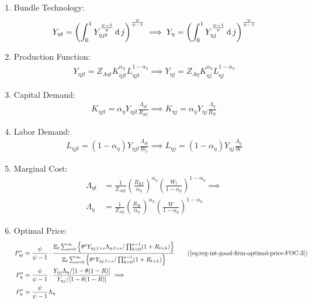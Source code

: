 \documentclass[
thesis.tex
]{subfiles}
\begin{document}
\begin{enumerate}
	\item Bundle Technology:
	\begin{align}
		Y_{\eta t} = \left( \int_{0}^{1} Y_{\eta jt}^{\frac{\psi-1}{\psi}} \dif j \right)^{\frac{\psi}{\psi-1}} \implies %
		Y_{\eta} = \left( \int_{0}^{1} Y_{\eta j}^{\frac{\psi-1}{\psi}} \dif j \right)^{\frac{\psi}{\psi-1}} \label{eq:reg-ss-final-goods-firm-bundle-rule}
	\end{align}
	
	\item Production Function:
	\begin{align}
		Y_{\eta jt} = Z_{A\eta t} K_{\eta jt}^{\alpha_{\eta}} L_{\eta jt}^{1-{\alpha_{\eta}}} \implies Y_{\eta j} = Z_{A\eta} K_{\eta j}^{\alpha_{\eta}} L_{\eta j}^{1-{\alpha_{\eta}}} \label{eq:reg-ss-int-good-firm-production-function}
	\end{align}
	
	\item Capital Demand:
	\begin{align}
		K_{\eta jt} = {\alpha_{\eta}} Y_{\eta jt} \frac{\Lambda_{\eta t}}{R_{Kt}} \implies K_{\eta j} = {\alpha_{\eta}} Y_{\eta j} \frac{\Lambda_{\eta}}{R_K} \label{eq:reg-ss-int-good-firm-FOC-Kt}
	\end{align}
	
	\item Labor Demand:
	\begin{align}
		L_{\eta jt} = (1-{\alpha_{\eta}}) Y_{\eta jt} \frac{\Lambda_{\eta t}}{W_t} \implies L_{\eta j} = (1 -{\alpha_{\eta}}) Y_{\eta j} \frac{\Lambda_{\eta}}{W} \label{eq:reg-ss-int-good-firm-FOC-Lt}
	\end{align}
	
	\item Marginal Cost:
	\begin{align}
		\Lambda_{\eta t} &= \frac{1}{Z_{A\eta t}} \left( \frac{R_{Kt}}{{\alpha_{\eta}}} \right)^{{\alpha_{\eta}}} \left( \frac{W_t}{1-{\alpha_{\eta}}} \right)^{1-{\alpha_{\eta}}} \implies \nonumber \\
		\Lambda_{\eta} &= \frac{1}{Z_{A\eta}} \left( \frac{R_K}{{\alpha_{\eta}}} \right)^{{\alpha_{\eta}}} \left( \frac{W}{1-{\alpha_{\eta}}} \right)^{1-{\alpha_{\eta}}} \label{eq:reg-ss-int-good-firm-MC-2}
	\end{align}
	
	\item Optimal Price:
	\begin{alignat}{2}
		P_{\eta t}^{\ast} &= \frac{\psi}{\psi-1} \cdot \frac{\E \sum_{s=0}^{\infty} \left\{\theta^s Y_{\eta j,t+s} \Lambda_{\eta, t+s} / \prod_{k=0}^{s-1}(1+R_{t+k}) \right\}} {\E \sum_{s=0}^{\infty} \left\{ \theta^s Y_{\eta j,t+s} / \prod_{k=0}^{s-1}(1+R_{t+k}) \right\}} \tag{\ref{eq:reg-int-good-firm-optimal-price-FOC-3}} \\
		P_{\eta}^{\ast} &= \frac{\psi}{\psi-1} \cdot \frac{ Y_{\eta j} \Lambda_{\eta} / [1-\theta(1-R)]} {Y_{\eta j} / [1-\theta(1-R)]} \implies \nonumber \\
		P_{\eta}^{\ast} &= \frac{\psi}{\psi-1} \Lambda_{\eta} \label{eq:reg-ss-int-good-firm-optimal-price-FOC-3}
	\end{alignat}
	

\end{enumerate}
\end{document}

